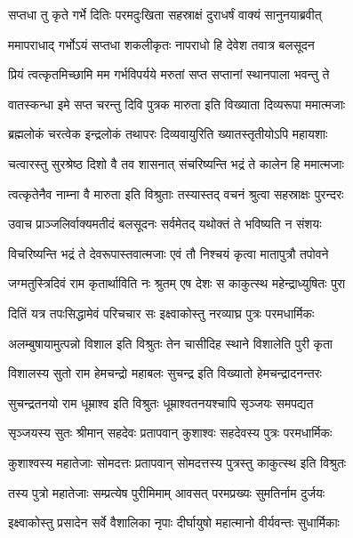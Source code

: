 
\twolineshloka
{सप्तधा तु कृते गर्भे दितिः परमदुःखिता}
{सहस्राक्षं दुराधर्षं वाक्यं सानुनयाब्रवीत्} %

\twolineshloka
{ममापराधाद् गर्भोऽयं सप्तधा शकलीकृतः}
{नापराधो हि देवेश तवात्र बलसूदन} %

\twolineshloka
{प्रियं त्वत्कृतमिच्छामि मम गर्भविपर्यये}
{मरुतां सप्त सप्तानां स्थानपाला भवन्तु ते} %

\twolineshloka
{वातस्कन्धा इमे सप्त चरन्तु दिवि पुत्रक}
{मारुता इति विख्याता दिव्यरूपा ममात्मजाः} %

\twolineshloka
{ब्रह्मलोकं चरत्वेक इन्द्रलोकं तथापरः}
{दिव्यवायुरिति ख्यातस्तृतीयोऽपि महायशाः} %

\twolineshloka
{चत्वारस्तु सुरश्रेष्ठ दिशो वै तव शासनात्}
{संचरिष्यन्ति भद्रं ते कालेन हि ममात्मजाः} %

\twolineshloka
{त्वत्कृतेनैव नाम्ना वै मारुता इति विश्रुताः}
{तस्यास्तद् वचनं श्रुत्वा सहस्राक्षः पुरन्दरः} %

\twolineshloka
{उवाच प्राञ्जलिर्वाक्यमतीदं बलसूदनः}
{सर्वमेतद् यथोक्तं ते भविष्यति न संशयः} %

\twolineshloka
{विचरिष्यन्ति भद्रं ते देवरूपास्तवात्मजाः}
{एवं तौ निश्चयं कृत्वा मातापुत्रौ तपोवने} %

\twolineshloka
{जग्मतुस्त्रिदिवं राम कृतार्थाविति नः श्रुतम्}
{एष देशः स काकुत्स्थ महेन्द्राध्युषितः पुरा} %

\twolineshloka
{दितिं यत्र तपःसिद्धामेवं परिचचार सः}
{इक्ष्वाकोस्तु नरव्याघ्र पुत्रः परमधार्मिकः} %

\twolineshloka
{अलम्बुषायामुत्पन्नो विशाल इति विश्रुतः}
{तेन चासीदिह स्थाने विशालेति पुरी कृता} %

\twolineshloka
{विशालस्य सुतो राम हेमचन्द्रो महाबलः}
{सुचन्द्र इति विख्यातो हेमचन्द्रादनन्तरः} %

\twolineshloka
{सुचन्द्रतनयो राम धूम्राश्व इति विश्रुतः}
{धूम्राश्वतनयश्चापि सृञ्जयः समपद्यत} %

\twolineshloka
{सृञ्जयस्य सुतः श्रीमान् सहदेवः प्रतापवान्}
{कुशाश्वः सहदेवस्य पुत्रः परमधार्मिकः} %

\twolineshloka
{कुशाश्वस्य महातेजाः सोमदत्तः प्रतापवान्}
{सोमदत्तस्य पुत्रस्तु काकुत्स्थ इति विश्रुतः} %

\twolineshloka
{तस्य पुत्रो महातेजाः सम्प्रत्येष पुरीमिमाम्}
{आवसत् परमप्रख्यः सुमतिर्नाम दुर्जयः} %

\twolineshloka
{इक्ष्वाकोस्तु प्रसादेन सर्वे वैशालिका नृपाः}
{दीर्घायुषो महात्मानो वीर्यवन्तः सुधार्मिकाः} %

